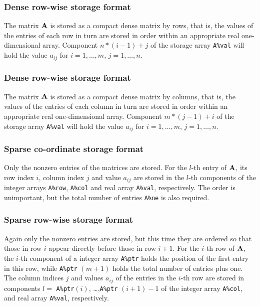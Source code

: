 \documentclass{galahad}
\begin{document}
\subsubsection{Dense row-wise storage format}\label{dense}
The matrix ${\mathbf{A}}$ is stored as a compact 
dense matrix by rows, that is, the values of the entries of each row in turn are
stored in order within an appropriate real one-dimensional array.
Component $n \ast (i-1) + j$ of the storage array {\tt A\%val} will hold the 
value $a_{ij}$ for $i = 1, \ldots , m$, $j = 1, \ldots , n$.

\subsubsection{Dense row-wise storage format}\label{densecolwise}
The matrix ${\mathbf{A}}$ is stored as a compact 
dense matrix by columns, that is, the values of the entries of each column 
in turn are stored in order within an appropriate real one-dimensional array.
Component $m \ast (j-1) + i$ of the storage array {\tt A\%val} will hold the 
value $a_{ij}$ for $i = 1, \ldots , m$, $j = 1, \ldots , n$.

\subsubsection{Sparse co-ordinate storage format}\label{coordinate}
Only the nonzero entries of the matrices are stored. For the 
$l$-th entry of ${\mathbf{A}}$, its row index $i$, column index $j$ 
and value $a_{ij}$
are stored in the $l$-th components of the integer arrays {\tt A\%row}, 
{\tt A\%col} and real array {\tt A\%val}, respectively.
The order is unimportant, but the total
number of entries {\tt A\%ne} is also required. 

\subsubsection{Sparse row-wise storage format}\label{rowwise}
Again only the nonzero entries are stored, but this time
they are ordered so that those in row $i$ appear directly before those
in row $i+1$. For the $i$-th row of ${\mathbf{A}}$, the $i$-th component of a 
integer array {\tt A\%ptr} holds the position of the first entry in this row,
while {\tt A\%ptr} $(m+1)$ holds the total number of entries plus one.
The column indices $j$ and values $a_{ij}$ of the entries in the $i$-th row 
are stored in components 
$l =$ {\tt A\%ptr}$(i)$, \ldots ,{\tt A\%ptr} $(i+1)-1$ of the 
integer array {\tt A\%col}, and real array {\tt A\%val}, respectively. 
\end{document}
